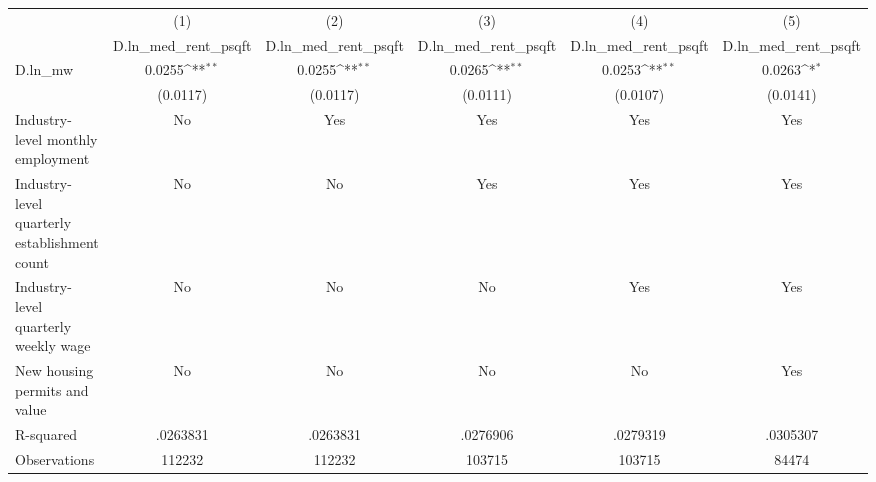 {
\def\sym#1{\ifmmode^{#1}\else\(^{#1}\)\fi}
\begin{tabular}{l*{5}{c}}
\hline\hline
          &\multicolumn{1}{c}{(1)}&\multicolumn{1}{c}{(2)}&\multicolumn{1}{c}{(3)}&\multicolumn{1}{c}{(4)}&\multicolumn{1}{c}{(5)}\\
          &\multicolumn{1}{c}{D.ln\_med\_rent\_psqft}&\multicolumn{1}{c}{D.ln\_med\_rent\_psqft}&\multicolumn{1}{c}{D.ln\_med\_rent\_psqft}&\multicolumn{1}{c}{D.ln\_med\_rent\_psqft}&\multicolumn{1}{c}{D.ln\_med\_rent\_psqft}\\
\hline
D.ln\_mw   &   0.0255\sym{**} &   0.0255\sym{**} &   0.0265\sym{**} &   0.0253\sym{**} &   0.0263\sym{*}  \\
          & (0.0117)         & (0.0117)         & (0.0111)         & (0.0107)         & (0.0141)         \\
\hline
Industry-level monthly employment&       No         &      Yes         &      Yes         &      Yes         &      Yes         \\
Industry-level quarterly establishment count&       No         &       No         &      Yes         &      Yes         &      Yes         \\
Industry-level quarterly weekly wage&       No         &       No         &       No         &      Yes         &      Yes         \\
New housing permits and value&       No         &       No         &       No         &       No         &      Yes         \\
R-squared & .0263831         & .0263831         & .0276906         & .0279319         & .0305307         \\
Observations&   112232         &   112232         &   103715         &   103715         &    84474         \\
\hline\hline
\end{tabular}
}
